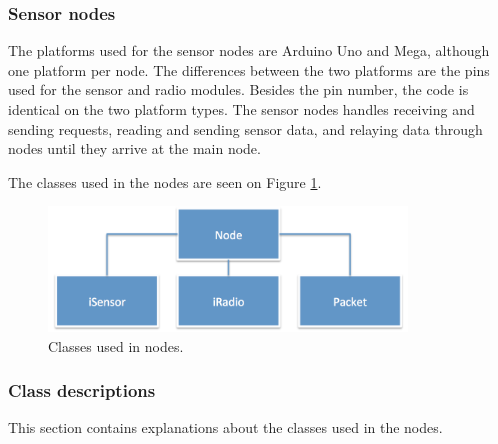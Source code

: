 \subsubsection*{Sensor nodes}
The platforms used for the sensor nodes are Arduino Uno and Mega, although one platform per node. The differences between the two platforms are the pins used for the sensor and radio modules. Besides the pin number, the code is identical on the two platform types. The sensor nodes handles receiving and sending requests, reading and sending sensor data, and relaying data through nodes until they arrive at the main node. 

The classes used in the nodes are seen on Figure \ref{fig:nodeClass}.
\begin{figure}[h!]
\centering
\includegraphics[width=0.85\textwidth]{chapters/implementation/figures/nodeClass.png}
\caption{Classes used in nodes.}
\label{fig:nodeClass}
\end{figure}


\subsubsection*{Class descriptions}
This section contains explanations about the classes used in the nodes.

